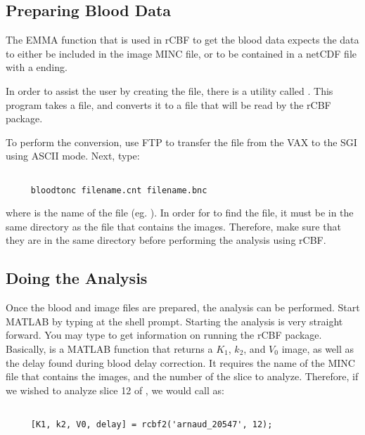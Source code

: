 \subsection{Preparing Blood Data}

The EMMA function  that is used in rCBF to get
the blood data expects the data to either be included in the image
MINC file, or to be contained in a netCDF file with a 
ending.

In order to assist the user by creating the  file, there
is a utility called .  This program takes a
 file, and converts it to a  file that will be
read by the rCBF package.

To perform the conversion, use FTP to transfer the  file
from the VAX to the SGI using ASCII mode.  Next, type:

\begin{verbatim}

     bloodtonc filename.cnt filename.bnc

\end{verbatim}

where  is the name of the file (eg.
).  In order for  to find the
 file, it must be in the same directory as the 
file that contains the images.  Therefore, make sure that they are in
the same directory before performing the analysis using rCBF.


\subsection{Doing the Analysis}

Once the blood and image files are prepared, the analysis can be
performed.  Start MATLAB by typing  at the shell prompt.
Starting the analysis is very straight forward.  You may type
 to get information on running the rCBF package.
Basically,  is a MATLAB function that returns a $K_1$,
$k_2$, and $V_0$ image, as well as the delay found during blood delay
correction.  It requires the name of the MINC file that contains the
images, and the number of the slice to analyze.  Therefore, if we
wished to analyze slice 12 of , we would call
 as:

\begin{verbatim}

     [K1, k2, V0, delay] = rcbf2('arnaud_20547', 12);

\end{verbatim}

